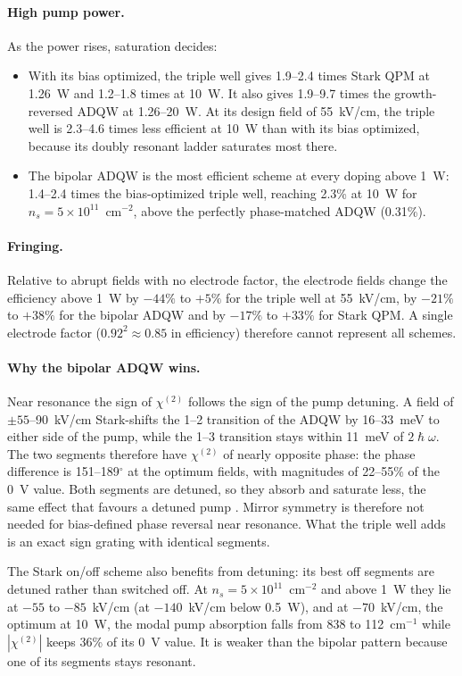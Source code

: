 \documentclass[11pt]{article}
\newcommand{\chitwo}{\chi^{(2)}}
\begin{document}
\paragraph{High pump power.} As the power rises, saturation decides:
\begin{itemize}
\item With its bias optimized, the triple well gives 1.9--2.4 times Stark QPM at 1.26~W and 1.2--1.8 times at 10~W. It also gives 1.9--9.7 times the growth-reversed ADQW at 1.26--20~W. At its design field of 55~kV/cm, the triple well is 2.3--4.6 times less efficient at 10~W than with its bias optimized, because its doubly resonant ladder saturates most there.
\item The bipolar ADQW is the most efficient scheme at every doping above 1~W: 1.4--2.4 times the bias-optimized triple well, reaching 2.3\% at 10~W for $n_s=5\times10^{11}$~cm$^{-2}$, above the perfectly phase-matched ADQW (0.31\%).
\end{itemize}

\paragraph{Fringing.} Relative to abrupt fields with no electrode factor, the electrode fields change the efficiency above 1~W by $-44\%$ to $+5\%$ for the triple well at 55~kV/cm, by $-21\%$ to $+38\%$ for the bipolar ADQW and by $-17\%$ to $+33\%$ for Stark QPM. A single electrode factor ($0.92^2\approx0.85$ in efficiency) therefore cannot represent all schemes.

\paragraph{Why the bipolar ADQW wins.} Near resonance the sign of $\chitwo$ follows the sign of the pump detuning. A field of $\pm55$--90~kV/cm Stark-shifts the 1--2 transition of the ADQW by 16--33~meV to either side of the pump, while the 1--3 transition stays within 11~meV of $2\hslash\omega$. The two segments therefore have $\chitwo$ of nearly opposite phase: the phase difference is 151--189$^\circ$ at the optimum fields, with magnitudes of 22--55\% of the 0~V value. Both segments are detuned, so they absorb and saturate less, the same effect that favours a detuned pump \cite{OwnbyNL02}. Mirror symmetry is therefore not needed for bias-defined phase reversal near resonance. What the triple well adds is an exact sign grating with identical segments.

The Stark on/off scheme also benefits from detuning: its best off segments are detuned rather than switched off. At $n_s=5\times10^{11}$~cm$^{-2}$ and above 1~W they lie at $-55$ to $-85$~kV/cm (at $-140$~kV/cm below 0.5~W), and at $-70$~kV/cm, the optimum at 10~W, the modal pump absorption falls from 838 to 112~cm$^{-1}$ while $|\chitwo|$ keeps 36\% of its 0~V value. It is weaker than the bipolar pattern because one of its segments stays resonant.
\end{document}
